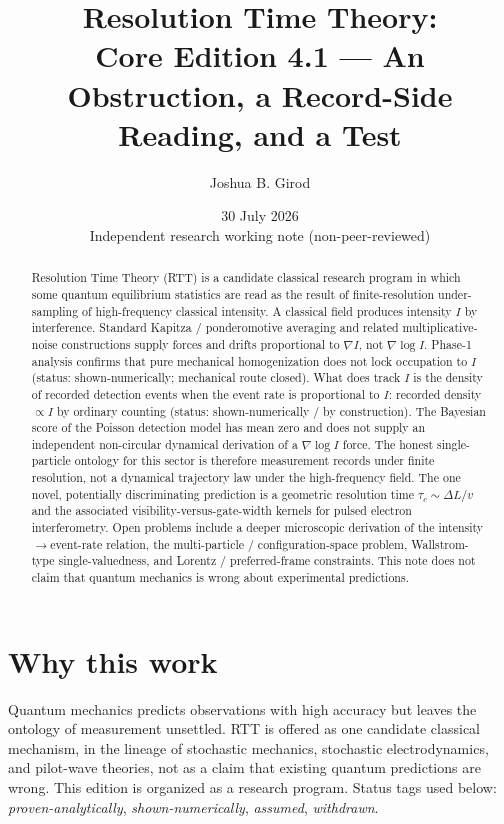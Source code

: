 \documentclass[11pt]{article}
\title{Resolution Time Theory:\\[0.4em]
Core Edition 4.1 --- An Obstruction, a Record-Side Reading, and a Test}
\author{Joshua B. Girod}
\date{30 July 2026 \\[0.3em] {\normalsize Independent research working note (non-peer-reviewed)}}
\begin{document}
\maketitle

\begin{abstract}
Resolution Time Theory (RTT) is a candidate classical research program in which some quantum equilibrium statistics are read as the result of finite-resolution under-sampling of high-frequency classical intensity.
A classical field produces intensity $I$ by interference. Standard Kapitza / ponderomotive averaging and related multiplicative-noise constructions supply forces and drifts proportional to $\nabla I$, not $\nabla\log I$.
Phase-1 analysis confirms that pure mechanical homogenization does not lock occupation to $I$ (status: shown-numerically; mechanical route closed).
What does track $I$ is the density of recorded detection events when the event rate is proportional to $I$: recorded density $\propto I$ by ordinary counting (status: shown-numerically / by construction).
The Bayesian score of the Poisson detection model has mean zero and does not supply an independent non-circular dynamical derivation of a $\nabla\log I$ force.
The honest single-particle ontology for this sector is therefore measurement records under finite resolution, not a dynamical trajectory law under the high-frequency field.
The one novel, potentially discriminating prediction is a geometric resolution time $\tau_c\sim\Delta L/v$ and the associated visibility-versus-gate-width kernels for pulsed electron interferometry.
Open problems include a deeper microscopic derivation of the intensity$\to$event-rate relation, the multi-particle / configuration-space problem, Wallstrom-type single-valuedness, and Lorentz / preferred-frame constraints.
This note does not claim that quantum mechanics is wrong about experimental predictions.
\end{abstract}

\tableofcontents
\newpage

\section{Why this work}

Quantum mechanics predicts observations with high accuracy but leaves the ontology of measurement unsettled.
RTT is offered as one candidate classical mechanism, in the lineage of stochastic mechanics, stochastic electrodynamics, and pilot-wave theories, not as a claim that existing quantum predictions are wrong.
This edition is organized as a research program. Status tags used below: \emph{proven-analytically}, \emph{shown-numerically}, \emph{assumed}, \emph{withdrawn}.
\end{document}
